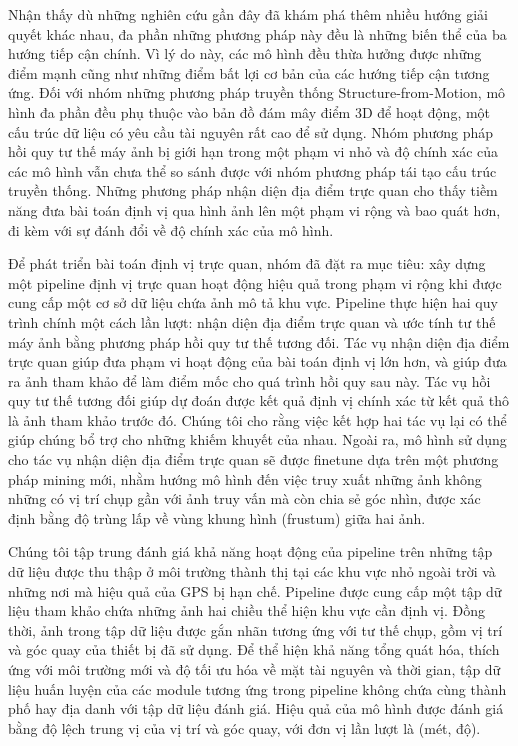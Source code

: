 Nhận thấy dù những nghiên cứu gần đây đã khám phá thêm nhiều hướng giải quyết khác nhau, đa phần những phương pháp này đều là những biến thể của ba hướng tiếp cận chính. Vì lý do này, các mô hình đều thừa hưởng được những điểm mạnh cũng như những điểm bất lợi cơ bản của các hướng tiếp cận tương ứng. Đối với nhóm những phương pháp truyền thống Structure-from-Motion, mô hình đa phần đều phụ thuộc vào bản đồ đám mây điểm 3D để hoạt động, một cấu trúc dữ liệu có yêu cầu tài nguyên rất cao để sử dụng. Nhóm phương pháp hồi quy tư thế máy ảnh bị giới hạn trong một phạm vi nhỏ và độ chính xác của các mô hình vẫn chưa thể so sánh được với nhóm phương pháp tái tạo cấu trúc truyền thống. Những phương pháp nhận diện địa điểm trực quan cho thấy tiềm năng đưa bài toán định vị qua hình ảnh lên một phạm vi rộng và bao quát hơn, đi kèm với sự đánh đổi về độ chính xác của mô hình.

Để phát triển bài toán định vị trực quan, nhóm đã đặt ra mục tiêu: xây dựng một pipeline định vị trực quan hoạt động hiệu quả trong phạm vi rộng khi được cung cấp một cơ sở dữ liệu chứa ảnh mô tả khu vực. Pipeline thực hiện hai quy trình chính một cách lần lượt: nhận diện địa điểm trực quan và ước tính tư thế máy ảnh bằng phương pháp hồi quy tư thế tương đối. Tác vụ nhận diện địa điểm trực quan giúp đưa phạm vi hoạt động của bài toán định vị lớn hơn, và giúp đưa ra ảnh tham khảo để làm điểm mốc cho quá trình hồi quy sau này. Tác vụ hồi quy tư thế tương đối giúp dự đoán được kết quả định vị chính xác từ kết quả thô là ảnh tham khảo trước đó. Chúng tôi cho rằng việc kết hợp hai tác vụ lại có thể giúp chúng bổ trợ cho những khiếm khuyết của nhau. Ngoài ra, mô hình sử dụng cho tác vụ nhận diện địa điểm trực quan sẽ được finetune dựa trên một phương pháp mining mới, nhằm hướng mô hình đến việc truy xuất những ảnh không những có vị trí chụp gần với ảnh truy vấn mà còn chia sẻ góc nhìn, được xác định bằng độ trùng lấp về vùng khung hình (frustum) giữa hai ảnh.

Chúng tôi tập trung đánh giá khả năng hoạt động của pipeline trên những tập dữ liệu được thu thập ở môi trường thành thị tại các khu vực nhỏ ngoài trời và những nơi mà hiệu quả của GPS bị hạn chế. Pipeline được cung cấp một tập dữ liệu tham khảo chứa những ảnh hai chiều thể hiện khu vực cần định vị. Đồng thời, ảnh trong tập dữ liệu được gắn nhãn tương ứng với tư thế chụp, gồm vị trí và góc quay của thiết bị đã sử dụng. Để thể hiện khả năng tổng quát hóa, thích ứng với môi trường mới và độ tối ưu hóa về mặt tài nguyên và thời gian, tập dữ liệu huấn luyện của các module tương ứng trong pipeline không chứa cùng thành phố hay địa danh với tập dữ liệu đánh giá. Hiệu quả của mô hình được đánh giá bằng độ lệch trung vị của vị trí và góc quay, với đơn vị lần lượt là (mét, độ).


